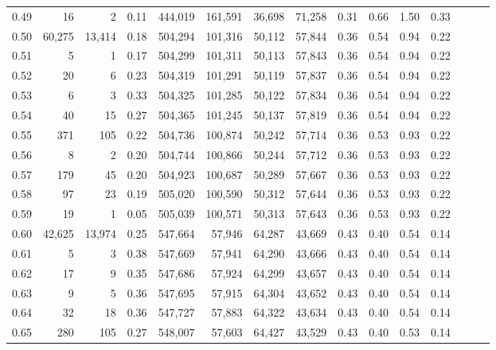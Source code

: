 \begin{tabular}{rrrrrrrrrrrrrrr}
0.49 &      16 &       2 &  0.11 &  444,019 &  161,591 &   36,698 &   71,258 &  0.31 &  0.66 &  1.50 &      0.33 \\
0.50 &  60,275 &  13,414 &  0.18 &  504,294 &  101,316 &   50,112 &   57,844 &  0.36 &  0.54 &  0.94 &      0.22 \\
0.51 &       5 &       1 &  0.17 &  504,299 &  101,311 &   50,113 &   57,843 &  0.36 &  0.54 &  0.94 &      0.22 \\
0.52 &      20 &       6 &  0.23 &  504,319 &  101,291 &   50,119 &   57,837 &  0.36 &  0.54 &  0.94 &      0.22 \\
0.53 &       6 &       3 &  0.33 &  504,325 &  101,285 &   50,122 &   57,834 &  0.36 &  0.54 &  0.94 &      0.22 \\
0.54 &      40 &      15 &  0.27 &  504,365 &  101,245 &   50,137 &   57,819 &  0.36 &  0.54 &  0.94 &      0.22 \\
0.55 &     371 &     105 &  0.22 &  504,736 &  100,874 &   50,242 &   57,714 &  0.36 &  0.53 &  0.93 &      0.22 \\
0.56 &       8 &       2 &  0.20 &  504,744 &  100,866 &   50,244 &   57,712 &  0.36 &  0.53 &  0.93 &      0.22 \\
0.57 &     179 &      45 &  0.20 &  504,923 &  100,687 &   50,289 &   57,667 &  0.36 &  0.53 &  0.93 &      0.22 \\
0.58 &      97 &      23 &  0.19 &  505,020 &  100,590 &   50,312 &   57,644 &  0.36 &  0.53 &  0.93 &      0.22 \\
0.59 &      19 &       1 &  0.05 &  505,039 &  100,571 &   50,313 &   57,643 &  0.36 &  0.53 &  0.93 &      0.22 \\
0.60 &  42,625 &  13,974 &  0.25 &  547,664 &   57,946 &   64,287 &   43,669 &  0.43 &  0.40 &  0.54 &      0.14 \\
0.61 &       5 &       3 &  0.38 &  547,669 &   57,941 &   64,290 &   43,666 &  0.43 &  0.40 &  0.54 &      0.14 \\
0.62 &      17 &       9 &  0.35 &  547,686 &   57,924 &   64,299 &   43,657 &  0.43 &  0.40 &  0.54 &      0.14 \\
0.63 &       9 &       5 &  0.36 &  547,695 &   57,915 &   64,304 &   43,652 &  0.43 &  0.40 &  0.54 &      0.14 \\
0.64 &      32 &      18 &  0.36 &  547,727 &   57,883 &   64,322 &   43,634 &  0.43 &  0.40 &  0.54 &      0.14 \\
0.65 &     280 &     105 &  0.27 &  548,007 &   57,603 &   64,427 &   43,529 &  0.43 &  0.40 &  0.53 &      0.14 \\

\end{tabular}
